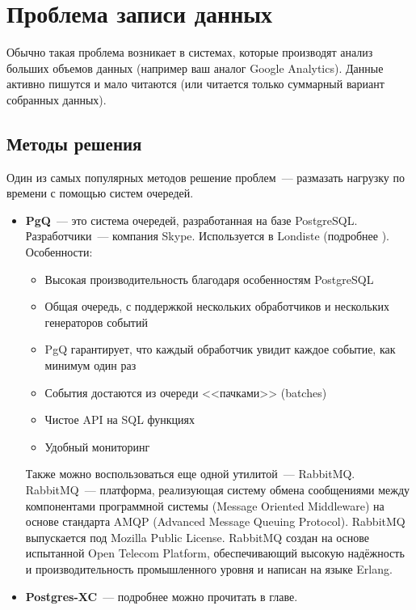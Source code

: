\section{Проблема записи данных}

Обычно такая проблема возникает в системах, которые производят анализ больших объемов данных (например ваш аналог Google Analytics). 
Данные активно пишутся и мало читаются (или читается только суммарный вариант собранных данных).

\subsection{Методы решения}

Один из самых популярных методов решение проблем~--- размазать нагрузку по времени с помощью систем очередей.
\begin{itemize}
\item \textbf{PgQ}~--- это система очередей, разработанная на базе PostgreSQL. Разработчики~--- компания Skype. 
Используется в Londiste (подробнее ). Особенности:
\begin{itemize}
\item Высокая производительность благодаря особенностям PostgreSQL
\item Общая очередь, с поддержкой нескольких обработчиков и нескольких генераторов событий
\item PgQ гарантирует, что каждый обработчик увидит каждое событие, как минимум один раз
\item События достаются из очереди <<пачками>> (batches)
\item Чистое API на SQL функциях
\item Удобный мониторинг
\end{itemize}

Также можно воспользоваться еще одной утилитой~--- RabbitMQ. 
RabbitMQ~--- платформа, реализующая систему обмена сообщениями между компонентами программной системы (Message Oriented Middleware) 
на основе стандарта AMQP (Advanced Message Queuing Protocol). RabbitMQ выпускается под Mozilla Public License.
RabbitMQ создан на основе испытанной Open Telecom Platform, обеспечивающий высокую надёжность и производительность промышленного 
уровня и написан на языке Erlang.

\item \textbf{Postgres-XC}~--- подробнее можно прочитать в  главе.
\end{itemize}